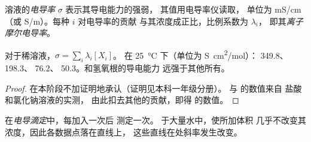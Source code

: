 \begin{definition}\label{def:g12:ph-conductivity-titrations:conductivity}
溶液的\emph{电导率} $\sigma$ 表示其导电能力的强弱，
其值用电导率仪读取，
单位为 \si{mS/cm}（或 \si{S/m}）。每种 $i$ 对电导率的贡献
与其浓度成正比，比例系数为 $\lambda_i$，
即其\emph{离子摩尔电导率}。
\end{definition}

\begin{proposition}[科尔劳施定律]\label{prop:g12:ph-conductivity-titrations:kohlrausch}
对于稀溶液，$\sigma = \sum_i \lambda_i [X_i]$。
在 \qty{25}{\celsius} 下（单位为 \si{S.cm^2/mol}）： 349.8、 198.3、
 76.2、 50.3。和氢氧根的导电能力
远强于其他所有。
\end{proposition}

\begin{proof}
在本阶段不加证明地承认（证明见本科一年级分册）。 与  的数值来自
盐酸和氯化钠溶液的实测，
由此扣去其他的贡献，即得  的数值。
\end{proof}

\begin{definition}[电导滴定]\label{def:g12:ph-conductivity-titrations:conductimetric}
在\emph{电导滴定}中，每加入一次后
测定一次。
于大量水中，使所加体积
几乎不改变其浓度，因此各数据点落在直线上，
这些直线在处斜率发生改变。
\end{definition}

